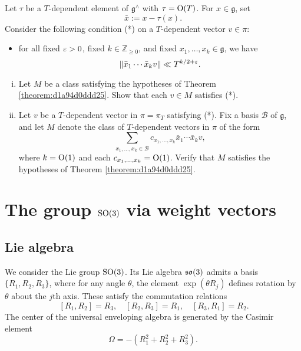 \documentclass[reqno]{amsart} 
\numberwithin{equation}{section}
\begin{document}
\begin{exercise}\label{exercise:d1aa39b6bf0d}
  Let $\tau$ be a $T$-dependent element of $\mathfrak{g}^\wedge$ with $\tau = \operatorname{O}(T)$.  For $x \in \mathfrak{g}$, set
  \begin{equation*}
    \bar{x} := x - \tau(x).
  \end{equation*}
  Consider the following condition (*) on a $T$-dependent vector $v \in \pi$:
  \begin{itemize}
  \item for all fixed $\varepsilon > 0$, fixed $k \in \mathbb{Z}_{\geq 0}$, and fixed $x_1,\dotsc,x_k \in \mathfrak{g}$, we have
    \begin{equation*}
      \lVert \bar{x}_1 \dotsb \bar{x}_k v \rVert \ll T^{k/2 + \varepsilon }.
    \end{equation*}
  \end{itemize}
  \begin{enumerate}[(i)]
  \item Let $M$ be a class satisfying the hypotheses of Theorem \ref{theorem:d1a94d0ddd25}.  Show that each $v \in M$ satisfies (*).
  \item Let $v$ be a $T$-dependent vector in $\pi = \pi_T$ satisfying (*).  Fix a basis $\mathcal{B}$ of $\mathfrak{g}$, and let $M$ denote the class of $T$-dependent vectors in $\pi$ of the form
    \begin{equation*}
      \sum_{x_1,\dotsc,x_k \in \mathcal{B}} c_{x_1,\dotsc,x_k} \bar{x}_1 \dotsb \bar{x}_{k} v,
    \end{equation*}
    where $k = \operatorname{O}(1)$ and each $c_{x_1,\dotsc,x_k} = \operatorname{O}(1)$.  Verify that $M$ satisfies the hypotheses of Theorem \ref{theorem:d1a94d0ddd25}.
  \end{enumerate}
\end{exercise}


\section{The group $\operatorname{SO}(3)$ via weight vectors}\label{sec:d1a9162ed4bc}

\subsection{Lie algebra}\label{sec:d1a9162ece67}
We consider the Lie group $\operatorname{SO}(3)$.  Its Lie algebra $\operatorname{\mathfrak{s}\mathfrak{o}}(3)$ admits a basis $\{R_1, R_2, R_3\}$, where for any angle $\theta$, the element $\exp(\theta R_j)$ defines rotation by $\theta$ about the $j$th axis.  These satisfy the commutation relations
\begin{equation*}
  ~ [R_1,R_2] = R_3, \quad [R_2,R_3] = R_1, \quad [R_3,R_1] = R_2.
\end{equation*}
The center of the universal enveloping algebra is generated by the Casimir element
\begin{equation*}
  \Omega = -(R_1^2 + R_2^2 + R_3^2).
\end{equation*}
\end{document}
